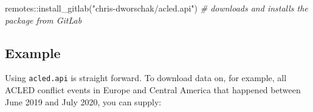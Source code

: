 \documentclass[
]{article}
\newenvironment{Shaded}{\begin{snugshade}}{\end{snugshade}}
\newcommand{\CommentTok}[1]{\textcolor[rgb]{0.56,0.35,0.01}{\textit{#1}}}
\newcommand{\FunctionTok}[1]{\textcolor[rgb]{0.00,0.00,0.00}{#1}}
\newcommand{\NormalTok}[1]{#1}
\newcommand{\SpecialCharTok}[1]{\textcolor[rgb]{0.00,0.00,0.00}{#1}}
\newcommand{\StringTok}[1]{\textcolor[rgb]{0.31,0.60,0.02}{#1}}
\begin{document}
\begin{Shaded}
\begin{Highlighting}[]
\NormalTok{remotes}\SpecialCharTok{::}\FunctionTok{install\_gitlab}\NormalTok{(}\StringTok{"chris{-}dworschak/acled.api"}\NormalTok{) }\CommentTok{\# downloads and installs the package from GitLab}
\end{Highlighting}
\end{Shaded}

\hypertarget{example}{%
\subsection{Example}\label{example}}

Using \texttt{acled.api} is straight forward. To download data on, for
example, all ACLED conflict events in Europe and Central America that
happened between June 2019 and July 2020, you can supply:
\end{document}

